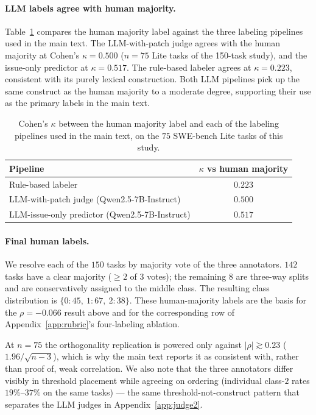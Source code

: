 \documentclass{article}
\begin{document}
\paragraph{LLM labels agree with human majority.}
Table~\ref{tab:human-vs-llm} compares the human majority label against
the three labeling pipelines used in the main text. The LLM-with-patch
judge agrees with the human majority at Cohen's $\kappa = 0.500$
($n{=}75$ Lite tasks of the 150-task study), and
the issue-only predictor at $\kappa = 0.517$. The rule-based labeler
agrees at $\kappa = 0.223$, consistent with its purely lexical
construction. Both LLM pipelines pick up the same construct as the
human majority to a moderate degree, supporting their use as the
primary labels in the main text.

\begin{table}[h]
\centering
\caption{Cohen's $\kappa$ between the human majority label and each of
the labeling pipelines used in the main text, on the $75$ SWE-bench
Lite tasks of this study.}
\label{tab:human-vs-llm}
\small
\begin{tabular}{lc}
\toprule
Pipeline & $\kappa$ vs human majority \\
\midrule
Rule-based labeler                       & $0.223$ \\
LLM-with-patch judge (Qwen2.5-7B-Instruct) & $0.500$ \\
LLM-issue-only predictor (Qwen2.5-7B-Instruct) & $0.517$ \\
\bottomrule
\end{tabular}
\end{table}

\paragraph{Final human labels.} We resolve each of the $150$ tasks by
majority vote of the three annotators. $142$ tasks have a clear
majority ($\geq 2$ of $3$ votes); the remaining $8$ are three-way
splits and are conservatively assigned to the middle class. The
resulting class distribution is $\{0{:}45,\ 1{:}67,\ 2{:}38\}$. These
human-majority labels are the basis for the $\rho = -0.066$ result
above and for the corresponding row of Appendix~\ref{app:rubric}'s
four-labeling ablation.


At $n{=}75$ the orthogonality replication is powered only against
$|\rho| \gtrsim 0.23$ ($1.96/\sqrt{n-3}$), which is why the main
text reports it as consistent with, rather than proof of, weak
correlation. We also note that the three annotators differ visibly in
threshold placement while agreeing on ordering (individual class-$2$
rates $19\%$--$37\%$ on the same tasks) --- the same
threshold-not-construct pattern that separates the LLM judges in
Appendix~\ref{app:judge2}.
\end{document}

